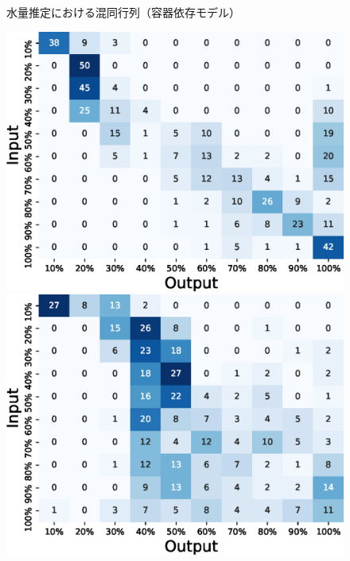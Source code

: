 \documentclass[submit,techrep,noauthor]{ipsj}
\begin{document}
\begin{figure}[!t]
\begin{minipage}[t]{0.32\linewidth}
  \end{minipage}
  \caption{水量推定における混同行列（容器依存モデル）}
  \label{fig:confusion_matrix_10_dependent}
\end{figure}

\begin{figure}[!t]
  \centering
  \begin{minipage}[t]{0.32\linewidth}
    \centering
    \includegraphics[width=0.9\linewidth]{figures/confusion_matrix_10_independent_coffee.eps}
  \end{minipage}
  \begin{minipage}[t]{0.32\linewidth}
    \centering
    \includegraphics[width=0.9\linewidth]{figures/confusion_matrix_10_independent_dishwashing.eps}
  \end{minipage}

\end{figure}
\end{document}
